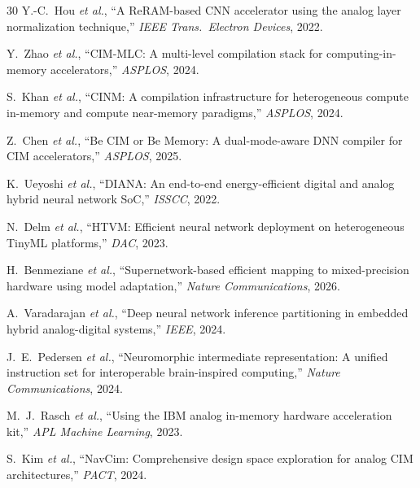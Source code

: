 \documentclass[11pt]{article}
\begin{document}
\begin{thebibliography}{30}
 Y.-C.~Hou \textit{et al.}, ``A ReRAM-based CNN accelerator using the analog layer normalization technique,'' \textit{IEEE Trans.\ Electron Devices}, 2022.

 Y.~Zhao \textit{et al.}, ``CIM-MLC: A multi-level compilation stack for computing-in-memory accelerators,'' \textit{ASPLOS}, 2024.

 S.~Khan \textit{et al.}, ``CINM: A compilation infrastructure for heterogeneous compute in-memory and compute near-memory paradigms,'' \textit{ASPLOS}, 2024.

 Z.~Chen \textit{et al.}, ``Be CIM or Be Memory: A dual-mode-aware DNN compiler for CIM accelerators,'' \textit{ASPLOS}, 2025.

 K.~Ueyoshi \textit{et al.}, ``DIANA: An end-to-end energy-efficient digital and analog hybrid neural network SoC,'' \textit{ISSCC}, 2022.

 N.~Delm \textit{et al.}, ``HTVM: Efficient neural network deployment on heterogeneous TinyML platforms,'' \textit{DAC}, 2023.

 H.~Benmeziane \textit{et al.}, ``Supernetwork-based efficient mapping to mixed-precision hardware using model adaptation,'' \textit{Nature Communications}, 2026.

 A.~Varadarajan \textit{et al.}, ``Deep neural network inference partitioning in embedded hybrid analog-digital systems,'' \textit{IEEE}, 2024.

 J.~E.~Pedersen \textit{et al.}, ``Neuromorphic intermediate representation: A unified instruction set for interoperable brain-inspired computing,'' \textit{Nature Communications}, 2024.

 M.~J.~Rasch \textit{et al.}, ``Using the IBM analog in-memory hardware acceleration kit,'' \textit{APL Machine Learning}, 2023.

 S.~Kim \textit{et al.}, ``NavCim: Comprehensive design space exploration for analog CIM architectures,'' \textit{PACT}, 2024.

\end{thebibliography}
\end{document}
